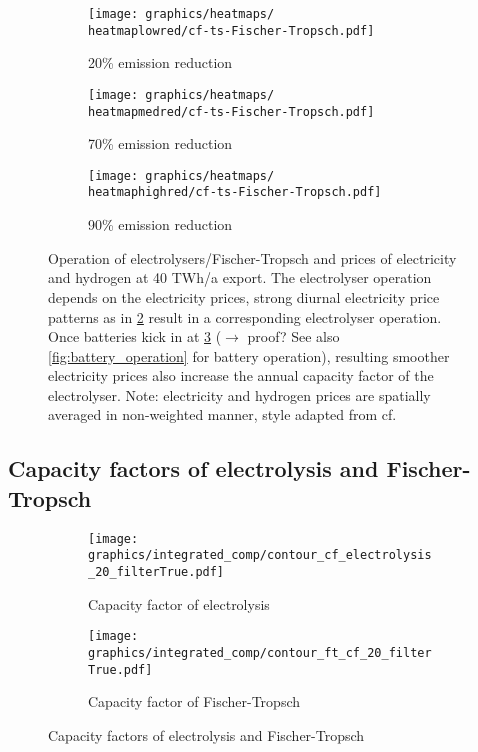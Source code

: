 \begin{figure}[h]
\begin{subfigure}[h]{0.33\textwidth}
    \end{subfigure}


    \begin{subfigure}[h]{0.33\textwidth}
        \centering
        \texttt{[image: graphics/heatmaps/\\heatmaplowred/cf-ts-Fischer-Tropsch.pdf]}
        \caption{20\% emission reduction}
        \label{fig:operation20}
    \end{subfigure}
    \begin{subfigure}[h]{0.33\textwidth}
        \centering
        \texttt{[image: graphics/heatmaps/\\heatmapmedred/cf-ts-Fischer-Tropsch.pdf]}
        \caption{70\% emission reduction}
        \label{fig:operation70}
    \end{subfigure}
    \begin{subfigure}[h]{0.33\textwidth}
        \centering
        \texttt{[image: graphics/heatmaps/\\heatmaphighred/cf-ts-Fischer-Tropsch.pdf]}
        \caption{90\% emission reduction}
        \label{fig:operation90}
    \end{subfigure}

    \caption{Operation of electrolysers/Fischer-Tropsch and prices of electricity and hydrogen at 40 TWh/a export. The electrolyser operation depends on the electricity prices, strong diurnal electricity price patterns as in \ref{fig:operation70} result in a corresponding electrolyser operation. Once batteries kick in at \ref{fig:operation90} ($\rightarrow$ proof? See also \ref{fig:battery_operation} for battery operation), resulting smoother electricity prices also increase the annual capacity factor of the electrolyser. Note: electricity and hydrogen prices are spatially averaged in non-weighted manner, style adapted from cf. \cite{Neumann2022}}
    \label{fig:operation-ely-ft}
\end{figure}



\subsection{Capacity factors of electrolysis and Fischer-Tropsch}

\begin{figure*}[h] %
    \centering
    \begin{subfigure}[b]{0.49\linewidth}
        \centering
        \texttt{[image: graphics/integrated\_comp/contour\_cf\_electrolysis\_20\_filterTrue.pdf]}
        \caption{Capacity factor of electrolysis}
        \label{fig:cf-ely}
    \end{subfigure}
    \hfill
    \begin{subfigure}[b]{0.49\linewidth}
        \centering
        \texttt{[image: graphics/integrated\_comp/contour\_ft\_cf\_20\_filterTrue.pdf]}
        \caption{Capacity factor of Fischer-Tropsch}
        \label{fig:cf-ft}
    \end{subfigure}
    \hfill
    \caption{Capacity factors of electrolysis and Fischer-Tropsch}
    \label{fig:cf-ely-ft}
\end{figure*}



\clearpage